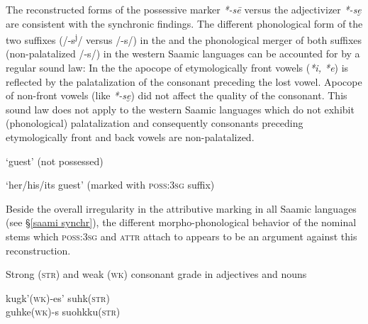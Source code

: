 {The reconstructed  forms of the possessive marker \textit{*-sē} \cite[73]{sammallahti1998b} versus the adjectivizer \textit{*-se̮} are consistent with the synchronic findings. The different phonological form of the two suffixes (/-s\textsuperscript{j}/ versus /-s/) in the  and the phonological merger of both suffixes (non-palatalized /-s/) in the western Saamic languages can be accounted for by a regular sound law: In the  the apocope of etymologically front vowels (\textit{*i, *e}) is reflected by the palatalization of the consonant preceding the lost vowel. Apocope of non-front vowels (like \textit{*-se̮}) did not affect the quality of the consonant. This sound law does not apply to the western Saamic languages which do not exhibit (phonological) palatalization and consequently consonants preceding etymologically front and back vowels are non-palatalized.
\begin{exe}
\settowidth{}
\ex
\begin{xlist}
\ex \rm{‘guest’ (not possessed)}
\begin{xlist}
\end{xlist}
\ex \rm{‘her/his/its guest’ (marked with \textsc{poss:3sg} suffix)}
\begin{xlist}
\end{xlist}
\end{xlist}
\end{exe}
Beside the overall irregularity in the attributive marking in all Saamic languages (see \S\ref{saami synchr}), the different morpho-phonological behavior of the nominal stems which \textsc{poss:3sg} and \textsc{attr} attach to appears to be an argument against this reconstruction. 
\begin{exe}
\settowidth{}
\ex \rm{Strong (\textsc{str}) and weak (\textsc{wk}) consonant grade in adjectives and nouns}
\begin{xlist}
\ex 
\glll 	kugk'(\textsc{wk})-es' suhk(\textsc{str}) 		\\
	guhke(\textsc{wk})-s suohkku(\textsc{str}) 		\\

\end{xlist}
\end{exe}}
